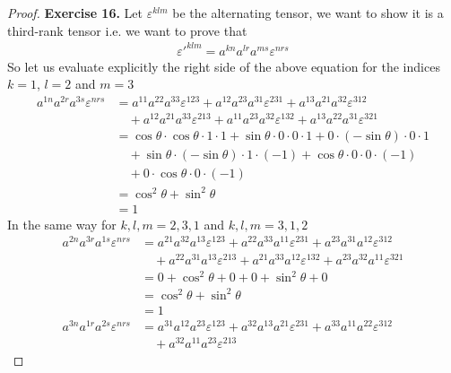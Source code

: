 \documentclass[11pt]{article}
\theoremstyle{definition}
\begin{document}
\begin{proof}{\textbf{Exercise 16.}}
    Let $\varepsilon^{klm}$ be the alternating tensor, we want to show it is
    a third-rank tensor i.e. we want to prove that
    \begin{align*}
        \varepsilon'^{klm} = a^{kn}a^{lr}a^{ms} \varepsilon^{nrs}
    \end{align*}
    So let us evaluate explicitly the right side of the above equation for the
    indices $k=1$, $l=2$ and $m = 3$ 
    \begin{align*}
        a^{1n}a^{2r}a^{3s}\varepsilon^{nrs} &= a^{11}a^{22}a^{33}\varepsilon^{123}
        + a^{12}a^{23}a^{31}\varepsilon^{231}
        + a^{13}a^{21}a^{32}\varepsilon^{312}\\
        &\quad+ a^{12}a^{21}a^{33}\varepsilon^{213}
        + a^{11}a^{23}a^{32}\varepsilon^{132}
        + a^{13}a^{22}a^{31}\varepsilon^{321}\\
        &= \cos\theta \cdot \cos\theta \cdot 1 \cdot 1
        + \sin\theta \cdot 0 \cdot 0 \cdot 1
        + 0 \cdot (-\sin\theta) \cdot 0 \cdot 1\\
        &\quad + \sin\theta \cdot (-\sin\theta) \cdot 1 \cdot (-1)
        + \cos\theta \cdot 0 \cdot 0 \cdot (-1)\\
        &\quad + 0 \cdot \cos\theta \cdot 0 \cdot (-1)\\
        &= \cos^2\theta + \sin^2\theta\\
        &= 1
    \end{align*}
    In the same way for $k,l,m=2,3,1$ and $k,l,m = 3,1,2$ 
    \begin{align*}
        a^{2n}a^{3r}a^{1s}\varepsilon^{nrs} &=
        a^{21}a^{32}a^{13}\varepsilon^{123}
        + a^{22}a^{33}a^{11}\varepsilon^{231}
        + a^{23}a^{31}a^{12}\varepsilon^{312}\\
        &\quad+ a^{22}a^{31}a^{13}\varepsilon^{213}
        + a^{21}a^{33}a^{12}\varepsilon^{132}
        + a^{23}a^{32}a^{11}\varepsilon^{321}\\
        &= 0 + \cos^2\theta + 0 + 0 + \sin^2\theta + 0\\
        &= \cos^2\theta + \sin^2\theta\\
        &= 1\\
        a^{3n}a^{1r}a^{2s}\varepsilon^{nrs} &=
        a^{31}a^{12}a^{23}\varepsilon^{123}
        + a^{32}a^{13}a^{21}\varepsilon^{231}
        + a^{33}a^{11}a^{22}\varepsilon^{312}\\
        &\quad+ a^{32}a^{11}a^{23}\varepsilon^{213}

\end{align*}
\end{proof}
\end{document}
